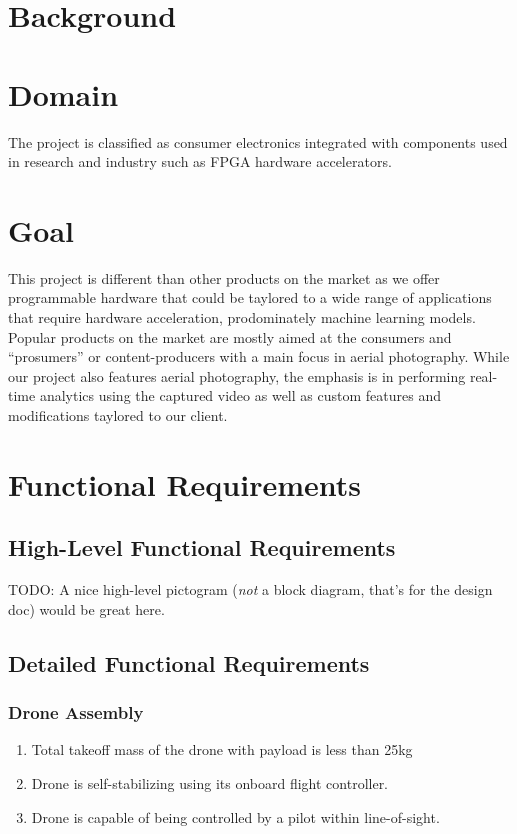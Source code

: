 \documentclass[10pt,letterpaper]{article}
\begin{document}
\section{Background}

% 
% 



\section{Domain}

The project is classified as consumer electronics integrated with components used in research and industry such as FPGA hardware accelerators. 

\section{Goal}

This project is different than other products on the market as we offer programmable hardware that could be taylored to a wide range of applications that require hardware acceleration, prodominately machine learning models. Popular products on the market are mostly aimed at the consumers and ``prosumers'' or content-producers with a main focus in aerial photography. While our project also features aerial photography, the emphasis is in performing real-time analytics using the captured video as well as custom features and modifications taylored to our client.

\section{Functional Requirements}\label{section:funcreq}

\subsection{High-Level Functional Requirements}\label{section:hlfuncreq}

TODO: A nice high-level pictogram (\textit{not} a block diagram, that's for the design doc) would be great here.

\subsection{Detailed Functional Requirements}\label{section:dfuncreq}

\subsubsection{Drone Assembly}
\begin{enumerate}[{F.DR}.1:]
	\item Total takeoff mass of the drone with payload is less than 25kg
	\item Drone is self-stabilizing using its onboard flight controller.
	\item Drone is capable of being controlled by a pilot within line-of-sight.

\end{enumerate}
\end{document}
